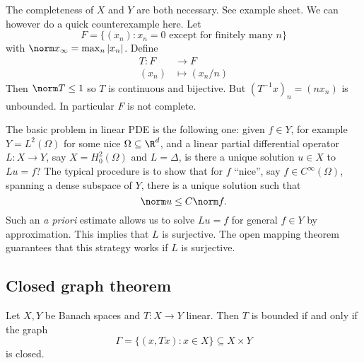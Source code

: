 \documentclass[a4paper]{article}
\begin{document}
\begin{remark}
  The completeness of \(X\) and \(Y\) are both necessary. See example sheet. We can however do a quick counterexample here. Let
  \[
    F = \{(x_n): x_n = 0 \text{ except for finitely many } n\}
  \]
  with \(\norm x_\infty = \max_n |x_n|\). Define
  \begin{align*}
    T: F &\to F \\
    (x_n) &\mapsto (x_n/n)
  \end{align*}
  Then \(\norm T \leq 1\) so \(T\) is continuous and bijective. But \((T^{-1}x)_n = (nx_n)\) is unbounded. In particular \(F\) is not complete.
\end{remark}

\begin{remark}
  The basic problem in linear PDE is the following one: given \(f \in Y\), for example \ \(Y = L^2(\Omega)\) for some nice \(\Omega \subseteq \R^d\), and a linear partial differential operator \(L: X \to Y\), say \(X = H_0^2(\Omega)\) and \(L = \Delta\), is there a unique solution \(u \in X\) to \(Lu = f\)? The typical procedure is to show that for \(f\) ``nice'', say \(f \in C^\infty(\Omega)\), spanning a dense subspace of \(Y\), there is a unique solution such that
  \[
    \norm u \leq C \norm f.
  \]
  Such an \emph{a priori} estimate allows us to solve \(Lu = f\) for general \(f \in Y\) by approximation. This implies that \(L\) is surjective. The open mapping theorem guarantees that this strategy works if \(L\) is surjective.
\end{remark}

\subsection{Closed graph theorem}

\begin{theorem}
  Let \(X, Y\) be Banach spaces and \(T: X \to Y\) linear. Then \(T\) is bounded if and only if the graph
  \[
    \Gamma = \{(x, Tx): x \in X\} \subseteq X \times Y
  \]
  is closed.
\end{theorem}
\end{document}
